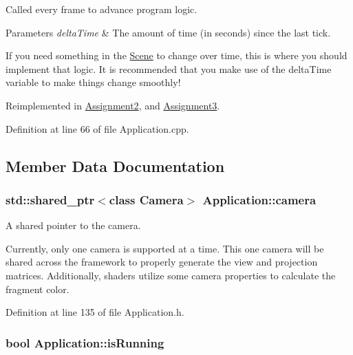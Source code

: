 Called every frame to advance program logic. 


\begin{DoxyParams}{Parameters}
{\em delta\+Time} & The amount of time (in seconds) since the last tick.\\
\hline
\end{DoxyParams}
If you need something in the \hyperlink{class_scene}{Scene} to change over time, this is where you should implement that logic. It is recommended that you make use of the delta\+Time variable to make things change smoothly! 

Reimplemented in \hyperlink{class_assignment2_a41544ad361dd798d5fae1ec3197fc66e}{Assignment2}, and \hyperlink{class_assignment3_a11256b6e7b38ab24baa92729cfb8ffe2}{Assignment3}.



Definition at line 66 of file Application.\+cpp.



\subsection{Member Data Documentation}
\hypertarget{class_application_a0e8589fcb13c520ba472473abe5a518d}{}
\subsubsection[{camera}]{\setlength{\rightskip}{0pt plus 5cm}std\+::shared\+\_\+ptr$<$class {\bf Camera}$>$ Application\+::camera\hspace{0.3cm}{\ttfamily [protected]}}\label{class_application_a0e8589fcb13c520ba472473abe5a518d}


A shared pointer to the camera. 

Currently, only one camera is supported at a time. This one camera will be shared across the framework to properly generate the view and projection matrices. Additionally, shaders utilize some camera properties to calculate the fragment color. 

Definition at line 135 of file Application.\+h.

\hypertarget{class_application_ae1c1ff7a7663d9baa9b65a7ba8e1dcf8}{}
\subsubsection[{is\+Running}]{\setlength{\rightskip}{0pt plus 5cm}bool Application\+::is\+Running\hspace{0.3cm}{\ttfamily [protected]}}\label{class_application_ae1c1ff7a7663d9baa9b65a7ba8e1dcf8}


